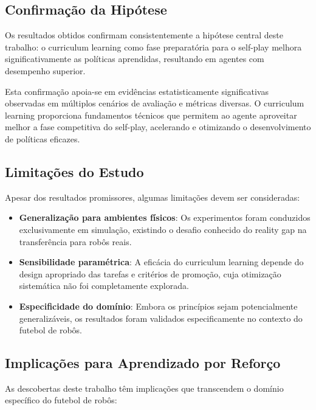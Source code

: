 \subsection{Confirmação da Hipótese}

Os resultados obtidos confirmam consistentemente a hipótese central deste trabalho: o curriculum learning como fase preparatória para o self-play melhora significativamente as políticas aprendidas, resultando em agentes com desempenho superior.

Esta confirmação apoia-se em evidências estatisticamente significativas observadas em múltiplos cenários de avaliação e métricas diversas. O curriculum learning proporciona fundamentos técnicos que permitem ao agente aproveitar melhor a fase competitiva do self-play, acelerando e otimizando o desenvolvimento de políticas eficazes.

\subsection{Limitações do Estudo}

Apesar dos resultados promissores, algumas limitações devem ser consideradas:

\begin{itemize}
    \item \textbf{Generalização para ambientes físicos}: Os experimentos foram conduzidos exclusivamente em simulação, existindo o desafio conhecido do reality gap na transferência para robôs reais.
    
    \item \textbf{Sensibilidade paramétrica}: A eficácia do curriculum learning depende do design apropriado das tarefas e critérios de promoção, cuja otimização sistemática não foi completamente explorada.
    
    \item \textbf{Especificidade do domínio}: Embora os princípios sejam potencialmente generalizáveis, os resultados foram validados especificamente no contexto do futebol de robôs.
\end{itemize}

\subsection{Implicações para Aprendizado por Reforço}

As descobertas deste trabalho têm implicações que transcendem o domínio específico do futebol de robôs:

